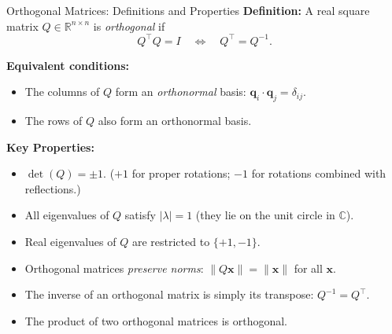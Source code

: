 \documentclass[12pt,a4paper]{article}
\begin{document}
\begin{infobox}{Orthogonal Matrices: Definitions and Properties}
\textbf{Definition:}
A real square matrix $Q \in \mathbb{R}^{n \times n}$ is \emph{orthogonal} if
\[
  Q^\top Q = I \quad \Longleftrightarrow \quad Q^\top = Q^{-1}.
\]

\textbf{Equivalent conditions:}
\begin{itemize}
  \item The columns of $Q$ form an \emph{orthonormal} basis: $\mathbf{q}_i \cdot \mathbf{q}_j = \delta_{ij}$.
  \item The rows of $Q$ also form an orthonormal basis.
\end{itemize}

\textbf{Key Properties:}
\begin{itemize}
  \item $\det(Q) = \pm 1$. ($+1$ for proper rotations; $-1$ for rotations combined with reflections.)
  \item All eigenvalues of $Q$ satisfy $|\lambda| = 1$ (they lie on the unit circle in $\mathbb{C}$).
  \item Real eigenvalues of $Q$ are restricted to $\{+1, -1\}$.
  \item Orthogonal matrices \emph{preserve norms}: $\|Q\mathbf{x}\| = \|\mathbf{x}\|$ for all $\mathbf{x}$.
  \item The inverse of an orthogonal matrix is simply its transpose: $Q^{-1} = Q^\top$.
  \item The product of two orthogonal matrices is orthogonal.
\end{itemize}
\end{infobox}
\end{document}
